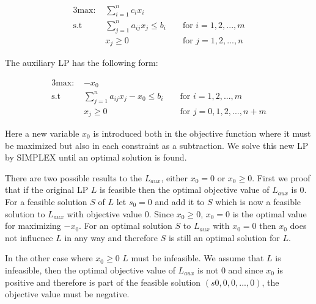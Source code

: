 \begin{alignat}{3}
\text{max: } &\sum_{i=1}^{n} c_i x_i\\
\text{s.t }  & \sum_{j=1}^{n} a_{ij} x_j \leq b_i  && \text{ for } i=1,2,...,m\\
             & x_j \geq 0                                    && \text{ for } j=1,2,...,n
\end{alignat}

The auxiliary LP has the following form:

\begin{alignat}{3}
\text{max: } & -x_0\\
\text{s.t }  & \sum_{j=1}^{n} a_{ij} x_j -x_0 \leq b_i  && \text{ for } i=1,2,...,m\\
             & x_j \geq 0                                    && \text{ for } j=0,1,2,...,n+m
\end{alignat}

Here a new variable $x_0$ is introduced both in the objective function where it must be maximized but also in each constraint as a subtraction. We solve this new LP by SIMPLEX until an optimal solution is found.

There are two possible results to the $L_{aux}$, either $x_0 = 0$ or $x_0 \geq 0$. First we proof that if the original LP $L$ is feasible then the optimal objective value of $L_{aux}$ is 0. For a feasible solution $S$ of $L$ let $s_0 = 0$ and add it to $S$ which is now a feasible solution to $L_{aux}$ with objective value $0$. Since $x_0 \geq 0$, $x_0 = 0$ is the optimal value for maximizing $-x_0$. For an optimal solution $S$ to $L_{aux}$ with $x_0 = 0$ then $x_0$ does not influence $L$ in any way and therefore $S$ is still an optimal solution for $L$. 

In the other case where $x_0 \geq 0$ $L$ must be infeasible. We assume that $L$ is infeasible, then the optimal objective value of $L_{aux}$ is not $0$ and since $x_0$ is positive and therefore is part of the feasible solution $(s0,0,0,...,0)$, the objective value must be negative.

